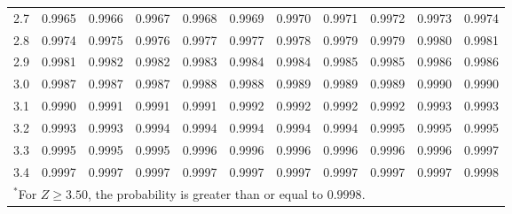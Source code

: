 \begin{table}[p]
\begin{center}
{\begin{tabular}{c | rrrrr | rrrrr |}
  2.7 & \scriptsize{0.9965} & \scriptsize{0.9966} & \scriptsize{0.9967} & \scriptsize{0.9968} & \scriptsize{0.9969} & \scriptsize{0.9970} & \scriptsize{0.9971} & \scriptsize{0.9972} & \scriptsize{0.9973} & \scriptsize{0.9974} \\
  2.8 & \scriptsize{0.9974} & \scriptsize{0.9975} & \scriptsize{0.9976} & \scriptsize{0.9977} & \scriptsize{0.9977} & \scriptsize{0.9978} & \scriptsize{0.9979} & \scriptsize{0.9979} & \scriptsize{0.9980} & \scriptsize{0.9981} \\
  2.9 & \scriptsize{0.9981} & \scriptsize{0.9982} & \scriptsize{0.9982} & \scriptsize{0.9983} & \scriptsize{0.9984} & \scriptsize{0.9984} & \scriptsize{0.9985} & \scriptsize{0.9985} & \scriptsize{0.9986} & \scriptsize{0.9986} \\
  \hline
  \hline
  3.0 & \scriptsize{0.9987} & \scriptsize{0.9987} & \scriptsize{0.9987} & \scriptsize{0.9988} & \scriptsize{0.9988} & \scriptsize{0.9989} & \scriptsize{0.9989} & \scriptsize{0.9989} & \scriptsize{0.9990} & \scriptsize{0.9990} \\
  3.1 & \scriptsize{0.9990} & \scriptsize{0.9991} & \scriptsize{0.9991} & \scriptsize{0.9991} & \scriptsize{0.9992} & \scriptsize{0.9992} & \scriptsize{0.9992} & \scriptsize{0.9992} & \scriptsize{0.9993} & \scriptsize{0.9993} \\
  3.2 & \scriptsize{0.9993} & \scriptsize{0.9993} & \scriptsize{0.9994} & \scriptsize{0.9994} & \scriptsize{0.9994} & \scriptsize{0.9994} & \scriptsize{0.9994} & \scriptsize{0.9995} & \scriptsize{0.9995} & \scriptsize{0.9995} \\
  3.3 & \scriptsize{0.9995} & \scriptsize{0.9995} & \scriptsize{0.9995} & \scriptsize{0.9996} & \scriptsize{0.9996} & \scriptsize{0.9996} & \scriptsize{0.9996} & \scriptsize{0.9996} & \scriptsize{0.9996} & \scriptsize{0.9997} \\
  3.4 & \scriptsize{0.9997} & \scriptsize{0.9997} & \scriptsize{0.9997} & \scriptsize{0.9997} & \scriptsize{0.9997} & \scriptsize{0.9997} & \scriptsize{0.9997} & \scriptsize{0.9997} & \scriptsize{0.9997} & \scriptsize{0.9998} \\
   \hline
\multicolumn{11}{l}{{\normalsize$^*$For $Z \geq 3.50$, the probability is greater than or equal to $0.9998$.}}
\end{tabular}}
\end{center}
\end{table}

